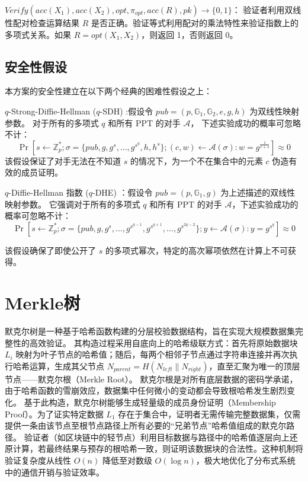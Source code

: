 $Verify(acc(X_1), acc(X_2), opt, \pi_{opt}, acc(R), pk) \rightarrow \{0, 1\}$：
验证者利用双线性配对检查运算结果 $R$ 是否正确。验证等式利用配对的乘法特性来验证指数上的多项式关系。如果 $R = opt(X_1, X_2)$，则返回 1，否则返回 0。

\subsection{安全性假设}
本方案的安全性建立在以下两个经典的困难性假设之上：
 
$q$-Strong-Diffie-Hellman ($q$-SDH) :假设令 $pub = (p, \mathbb{G}_1, \mathbb{G}_2, e, g, h)$ 为双线性映射参数。
 对于所有的多项式 $q$ 和所有 PPT 的对手 $\mathcal{A}$，
 下述实验成功的概率可忽略不计：
 \begin{equation}
    \Pr\left[ s \leftarrow \mathbb{Z}_p^*; \sigma = \{pub, g, g^s, \dots, g^{s^q}, h, h^s\}; (c, w) \leftarrow \mathcal{A}(\sigma) : w = g^{\frac{1}{c+s}} \right] \approx 0
 \end{equation}
 该假设保证了对手无法在不知道 $s$ 的情况下，为一个不在集合中的元素 $c$ 伪造有效的成员证明。
 
 $q$-Diffie-Hellman 指数 ($q$-DHE) ：假设令 $pub = (p, \mathbb{G}_1, g)$ 为上述描述的双线性映射参数。
 它强调对于所有的多项式 $q$ 和所有 PPT 的对手 $\mathcal{A}$，下述实验成功的概率可忽略不计：
 \begin{equation}
    \Pr\left[ s \leftarrow \mathbb{Z}_p^*; \sigma = \{pub, g, g^s, \dots, g^{s^{q-1}}, g^{s^{q+1}}, \dots, g^{s^{2q-2}}\}; y \leftarrow \mathcal{A}(\sigma) : y = g^{s^q} \right] \approx 0
 \end{equation}
 
 该假设确保了即使公开了 $s$ 的多项式幂次，特定的高次幂项依然在计算上不可获得。

\section{Merkle树}
默克尔树是一种基于哈希函数构建的分层校验数据结构，旨在实现大规模数据集完整性的高效验证。
其构造过程采用自底向上的哈希级联方式：首先将原始数据块 $L_i$ 映射为叶子节点的哈希值；随后，每两个相邻子节点通过字符串连接并再次执行哈希运算，生成其父节点 $N_{parent} = H(N_{left} \parallel N_{right})$，直至汇聚为唯一的顶层节点——默克尔根（Merkle Root）。
默克尔根是对所有底层数据的密码学承诺，由于哈希函数的雪崩效应，数据集中任何微小的变动都会导致根哈希发生剧烈变化。
基于此构造，默克尔树能够生成轻量级的成员身份证明（Membership Proof）。为了证实特定数据 $L_1$ 存在于集合中，证明者无需传输完整数据集，仅需提供一条由该节点至根节点路径上所有必要的“兄弟节点”哈希值组成的默克尔路径。
验证者（如区块链中的轻节点）利用目标数据与路径中的哈希值逐层向上还原计算，若最终结果与预存的根哈希一致，则证明该数据块的合法性。这种机制将验证复杂度从线性 $O(n)$ 降低至对数级 $O(\log n)$，极大地优化了分布式系统中的通信开销与验证效率。

